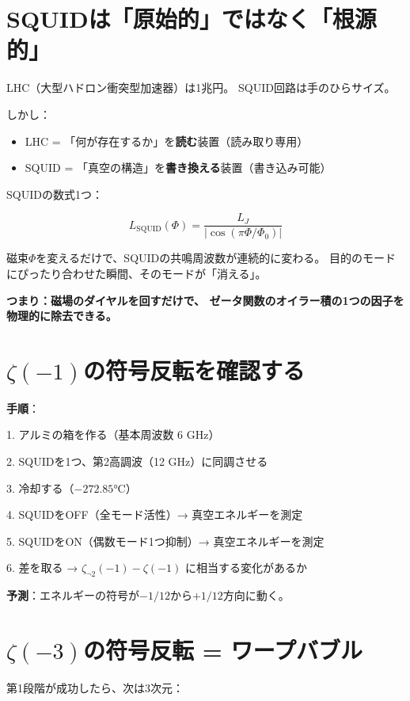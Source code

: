 \documentclass[12pt,a4paper]{article}
\begin{document}
\section{SQUIDは「原始的」ではなく「根源的」}

LHC（大型ハドロン衝突型加速器）は1兆円。
SQUID回路は手のひらサイズ。

しかし：
\begin{itemize}
\item LHC = 「何が存在するか」を\textbf{読む}装置（読み取り専用）
\item SQUID = 「真空の構造」を\textbf{書き換える}装置（書き込み可能）
\end{itemize}

SQUIDの数式1つ：

$$L_{\mathrm{SQUID}}(\Phi) = \frac{L_J}{|\cos(\pi\Phi/\Phi_0)|}$$

磁束$\Phi$を変えるだけで、SQUIDの共鳴周波数が連続的に変わる。
目的のモードにぴったり合わせた瞬間、そのモードが「消える」。

\textbf{つまり：磁場のダイヤルを回すだけで、
ゼータ関数のオイラー積の1つの因子を物理的に除去できる。}

\section{$\zeta(-1)$の符号反転を確認する}

\begin{physbox}[第1段階の実験（48万円）]
\textbf{手順}：

1. アルミの箱を作る（基本周波数 6 GHz）

2. SQUIDを1つ、第2高調波（12 GHz）に同調させる

3. 冷却する（$-272.85$°C）

4. SQUIDをOFF（全モード活性）→ 真空エネルギーを測定

5. SQUIDをON（偶数モード1つ抑制）→ 真空エネルギーを測定

6. 差を取る → $\zeta_{\neg 2}(-1) - \zeta(-1)$ に相当する変化があるか

\textbf{予測}：エネルギーの符号が$-1/12$から$+1/12$方向に動く。
\end{physbox}

\section{$\zeta(-3)$の符号反転 = ワープバブル}

第1段階が成功したら、次は3次元：
\end{document}
